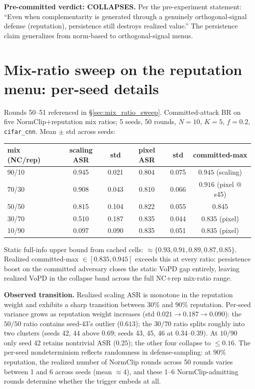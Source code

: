 \documentclass{article}
\begin{document}
\textbf{Pre-committed verdict: COLLAPSES.} Per the pre-experiment statement: ``Even when complementarity is generated through a genuinely orthogonal-signal defense (reputation), persistence still destroys realized value.'' The persistence claim generalizes from norm-based to orthogonal-signal menus.

\section{Mix-ratio sweep on the reputation menu: per-seed details}
\label{app:mix_ratio_sweep_details}

Rounds 50--51 referenced in §\ref{sec:mix_ratio_sweep}. Committed-attack BR on five NormClip+reputation mix ratios; 5 seeds, 50 rounds, $N{=}10$, $K{=}5$, $f{=}0.2$, \texttt{cifar\_cnn}. Mean $\pm$ std across seeds:

\begin{center}\small
\begin{tabular}{l|cc|cc|c}
\toprule
mix (NC/rep) & scaling ASR & std & pixel ASR & std & committed-max \\
\midrule
90/10 & 0.945 & 0.021 & 0.804 & 0.075 & $0.945$ (scaling) \\
70/30 & 0.908 & 0.043 & 0.810 & 0.066 & $0.916$ (pixel @ s45) \\
50/50 & 0.815 & 0.104 & 0.822 & 0.055 & $0.845$ \\
30/70 & 0.510 & 0.187 & 0.835 & 0.044 & $0.835$ (pixel) \\
10/90 & 0.097 & 0.090 & 0.835 & 0.051 & $0.835$ (pixel) \\
\bottomrule
\end{tabular}
\end{center}

Static full-info upper bound from cached cells: $\approx \{0.93, 0.91, 0.89, 0.87, 0.85\}$. Realized committed-max $\in [0.835, 0.945]$ exceeds this at every ratio: persistence boost on the committed adversary closes the static VoPD gap entirely, leaving realized VoPD in the collapse band across the full NC+rep mix-ratio range.

\textbf{Observed transition.} Realized scaling ASR is monotone in the reputation weight and exhibits a sharp transition between $30\%$ and $90\%$ reputation. Per-seed variance grows as reputation weight increases (std $0.021 \to 0.187 \to 0.090$): the $50/50$ ratio contains seed-43's outlier ($0.613$); the $30/70$ ratio splits roughly into two clusters (seeds 42, 44 above $0.69$; seeds 43, 45, 46 at $0.34$--$0.39$). At $10/90$ only seed 42 retains nontrivial ASR ($0.25$); the other four collapse to $\leq 0.16$. The per-seed nondeterminism reflects randomness in defense-sampling: at $90\%$ reputation, the realized number of NormClip rounds across 50 rounds varies between 1 and 6 across seeds (mean $\approx 4$), and these 1--6 NormClip-admitting rounds determine whether the trigger embeds at all.
\end{document}
